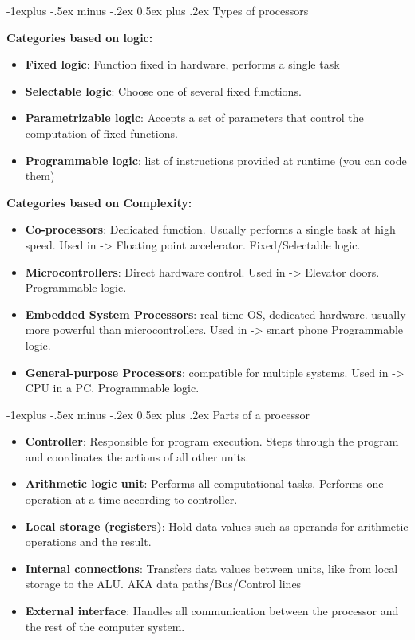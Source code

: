 \documentclass[letterpaper, 8pt]{extarticle}
\makeatletter
\renewcommand{\subsection}{\@startsection{subsection}{2}{0mm}%
                                {-1explus -.5ex minus -.2ex}%
                                {0.5ex plus .2ex}%
                                {\normalfont\small\bfseries}}
\makeatother
\begin{document}
\begin{multicols*}{4}
	\subsection{Types of processors}

	\textbf{Categories based on logic:} \\
	\begin{itemize}
		\item \textbf{Fixed logic}: Function fixed in hardware, performs a single task
		\item \textbf{Selectable logic}: Choose one of several fixed functions.
		\item \textbf{Parametrizable logic}: Accepts a set of parameters that control the computation of fixed functions.
		\item \textbf{Programmable logic}: list of instructions provided at runtime (you can code them)
	\end{itemize}

	\textbf{Categories based on Complexity:} \\
	\begin{itemize}
		\item \textbf{Co-processors}: Dedicated function. Usually performs a single task at high speed. Used in -> Floating point accelerator. Fixed/Selectable logic.
		\item \textbf{Microcontrollers}: Direct hardware control. Used in -> Elevator doors. Programmable logic.
		\item \textbf{Embedded System Processors}: real-time OS, dedicated hardware. usually more powerful than microcontrollers. Used in -> smart phone Programmable logic.
		\item \textbf{General-purpose Processors}: compatible for multiple systems. Used in -> CPU in a PC. Programmable logic.
	\end{itemize}

	\subsection{Parts of a processor}
	\begin{itemize}
		\item \textbf{Controller}: Responsible for program execution. Steps through the program and coordinates the actions of all other units.
		\item \textbf{Arithmetic logic unit}: Performs all computational tasks. Performs one operation at a time according to controller.
		\item \textbf{Local storage (registers)}: Hold data values such as operands for arithmetic operations and the result.
		\item \textbf{Internal connections}: Transfers data values between units, like from local storage to the ALU. AKA data paths/Bus/Control lines
		\item \textbf{External interface}: Handles all communication between the processor and the rest of the computer system.
	\end{itemize}


\end{multicols*}
\end{document}
